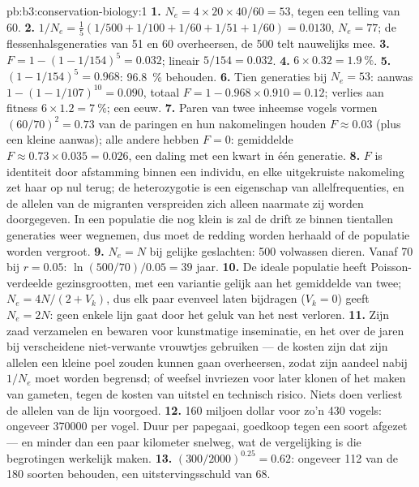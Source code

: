 \begin{solution}{pb:b3:conservation-biology:1}
\textbf{1.} $N_{e} = 4\times 20\times 40/60 = 53$, tegen een telling van 60.
\textbf{2.} $1/N_{e} = \tfrac{1}{5}(1/500 + 1/100 + 1/60 + 1/51 + 1/60) =
0.0130$, $N_{e} = 77$; de flessenhalsgeneraties van 51 en 60
overheersen, de 500 telt nauwelijks mee.
\textbf{3.} $F = 1 - (1 - 1/154)^{5} = 0.032$; lineair $5/154 = 0.032$.
\textbf{4.} $6\times 0.32 = \qty{1.9}{\%}$.
\textbf{5.} $(1 - 1/154)^{5} = 0.968$: \qty{96.8}{\%} behouden.
\textbf{6.} Tien generaties bij $N_{e} = 53$: aanwas $1 - (1 -
1/107)^{10} = 0.090$, totaal $F = 1 - 0.968\times 0.910 = 0.12$;
verlies aan fitness $6\times 1.2 = \qty{7}{\%}$; een eeuw.
\textbf{7.} Paren van twee inheemse vogels vormen $(60/70)^{2} = 0.73$
van de paringen en hun nakomelingen houden $F \approx 0.03$ (plus een
kleine aanwas); alle andere hebben $F = 0$: gemiddelde
$F \approx 0.73\times 0.035 = 0.026$, een daling met een kwart in één
generatie.
\textbf{8.} $F$ is identiteit door afstamming binnen een individu, en
elke uitgekruiste nakomeling zet haar op nul terug; de heterozygotie is
een eigenschap van allelfrequenties, en de allelen van de migranten
verspreiden zich alleen naarmate zij worden doorgegeven. In een
populatie die nog klein is zal de drift ze binnen tientallen generaties
weer wegnemen, dus moet de redding worden herhaald of de populatie
worden vergroot.
\textbf{9.} $N_{e} = N$ bij gelijke geslachten: 500 volwassen dieren.
Vanaf 70 bij $r =
0.05$: $\ln(500/70)/0.05 = 39$ jaar.
\textbf{10.} De ideale populatie heeft Poisson-verdeelde
gezinsgrootten, met een variantie gelijk aan het gemiddelde van twee;
$N_{e} = 4N/(2 + V_{k})$, dus elk paar evenveel laten bijdragen
($V_{k} = 0$) geeft $N_{e} = 2N$: geen enkele lijn gaat door het geluk
van het nest verloren.
\textbf{11.} Zijn zaad verzamelen en bewaren voor kunstmatige
inseminatie, en het over de jaren bij verscheidene niet-verwante
vrouwtjes gebruiken --- de kosten zijn dat zijn allelen een kleine poel
zouden kunnen gaan overheersen, zodat zijn aandeel nabij $1/N_{e}$ moet
worden begrensd; of weefsel invriezen voor later klonen of het maken
van gameten, tegen de kosten van uitstel en technisch risico. Niets
doen verliest de allelen van de lijn voorgoed.
\textbf{12.} \qty{160}{} miljoen dollar voor zo'n 430 vogels: ongeveer
\num{370000} per vogel. Duur per papegaai, goedkoop tegen een soort
afgezet --- en minder dan een paar kilometer snelweg, wat de
vergelijking is die begrotingen werkelijk maken.
\textbf{13.} $(300/2000)^{0.25} = 0.62$: ongeveer 112 van de 180
soorten behouden, een uitstervingsschuld van 68.

\end{solution}
